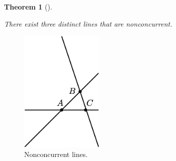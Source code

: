 \documentclass[
  letterpaper,
  10pt,
  reqno,
  twopage,
  openany]{book}
\theoremstyle{plain}
\theoremstyle{definition}
\theoremstyle{definition}
\theoremstyle{definition}
\theoremstyle{plain}
\theoremstyle{plain}
\newtheorem{theorem}{Theorem}[chapter]
\theoremstyle{remark}
\begin{document}
\leavevmode{}%
\begin{theorem}[]\label{thm-incidence2}

There exist three distinct lines that are nonconcurrent.

\end{theorem}

\begin{figure}

{\centering \includegraphics[width=1.5625in,height=\textheight]{./images/incidence-geometry-2-pics.png}

}

\caption{\label{fig-noncon}Nonconcurrent lines.}

\end{figure}
\end{document}

